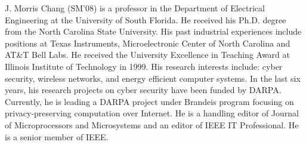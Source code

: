 \documentclass[journal]{IEEEtai}
\begin{document}
\begin{IEEEbiography}{J. Morris Chang}
	(SM'08) is a professor in the Department of Electrical Engineering at the University of South Florida. He received his Ph.D. degree from the North Carolina State University. His past industrial experiences include positions at Texas Instruments, Microelectronic Center of North Carolina and AT\&T Bell Labs. He received the University Excellence in Teaching Award at Illinois Institute of Technology in 1999. His research interests include: cyber security, wireless networks, and energy efficient computer systems. In the last six years, his research projects on cyber security have been funded by DARPA. Currently, he is leading a DARPA project under Brandeis program focusing on privacy-preserving computation over Internet. He is a handling editor of Journal of Microprocessors and Microsystems and an editor of IEEE IT Professional. He is a senior member of IEEE.
\end{IEEEbiography}
\fi


\newpage



%
\end{document}
